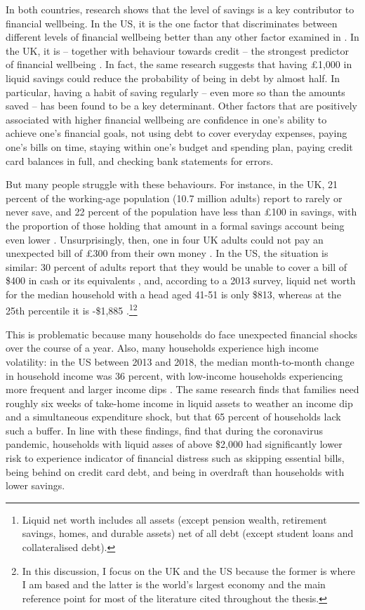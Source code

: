 In both countries, research shows that the level of savings is a key
contributor to financial wellbeing. In the US, it is the one factor that
discriminates between different levels of financial wellbeing better than any
other factor examined in \citep{cfpb2017financial}. In the UK, it is -- together
with behaviour towards credit -- the strongest predictor of financial wellbeing
\citep{mps2018building}. In fact, the same research suggests that having
\pounds1,000 in liquid savings could reduce the probability of being in debt by
almost half. In particular, having a habit of saving regularly -- even more so
than the amounts saved -- has been found to be a key determinant. Other
factors that are positively associated with higher financial wellbeing are
confidence in one's ability to achieve one's financial goals, not using debt to
cover everyday expenses, paying one's bills on time, staying within one's budget
and spending plan, paying credit card balances in full, and checking bank
statements for errors.

But many people struggle with these behaviours. For instance, in the UK, 21
percent of the working-age population (10.7 million adults) report to rarely or
never save, and 22 percent of the population have less than \pounds100 in
savings, with the proportion of those holding that amount in a formal savings account being even
lower \citep{mps2018building}. Unsurprisingly, then, one in four UK adults could
not pay an unexpected bill of \pounds300 from their own money
\citep{phillips2021supporting}. In the US, the situation is similar: 30 percent
of adults report that they would be unable to cover a bill of \$400 in cash or
its equivalents \citep{fed2022economic}, and, according to a 2013 survey,
liquid net worth for the median household with a head aged 41-51 is only \$813,
whereas at the 25th percentile it is -\$1,885
\citep{beshears2018behavioral}.\footnote{Liquid net worth includes all assets
    (except pension wealth, retirement savings, homes, and durable assets) net
of all debt (except student loans and collateralised debt).}\footnote{{\color{blue} In this discussion, I focus on the UK and the US because the former is where I am based and the latter is the world's largest economy and the main reference point for most of the literature cited throughout the thesis.}}

This is problematic because many households do face unexpected financial shocks
over the course of a year. Also, many households experience high income
volatility: in the US between 2013 and 2018, the median month-to-month change
in household income was 36 percent, with low-income households experiencing
more frequent and larger income dips \citep{jpmorgan2019weathering}. The same
research finds that families need roughly six weeks of take-home income
in liquid assets to weather an income dip and a simultaneous expenditure shock, but that 65
percent of households lack such a buffer. In line with these findings,
\citet{roll2020income} find that during the coronavirus pandemic, households
with liquid asses of above \$2,000 had significantly lower risk to experience indicator of financial distress such as skipping essential bills, being behind on
credit card debt, and being in overdraft than households with lower savings.

